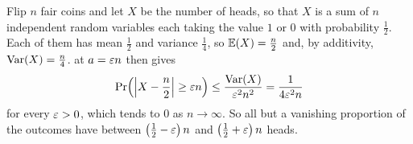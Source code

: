 \begin{boxexample}
    Flip $n$ fair coins and let $X$ be the number of heads, so that $X$ is a sum of $n$ independent random variables each taking the value $1$ or $0$ with probability $\frac{1}{2}$. Each of them has mean $\frac{1}{2}$ and variance $\frac{1}{4}$, so $\mathbb{E}(X) = \frac{n}{2}$ and, by additivity, $\operatorname{Var}\!\left( X \right) = \frac{n}{4}$.  at $a = \varepsilon n$ then gives
    \begin{align*}
        \Pr\!\left( \left\lvert X - \frac{n}{2} \right\rvert \geq \varepsilon n \right) \leq \frac{\operatorname{Var}\!\left( X \right)}{\varepsilon^2 n^2} = \frac{1}{4 \varepsilon^2 n}
    \end{align*}
    for every $\varepsilon > 0$, which tends to $0$ as $n \to \infty$. So all but a vanishing proportion of the outcomes have between $\left( \frac{1}{2} - \varepsilon \right) n$ and $\left( \frac{1}{2} + \varepsilon \right) n$ heads.
\end{boxexample}
